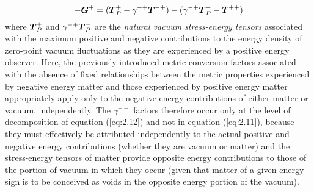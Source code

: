 \documentclass[notitlepage,12pt]{report}
\newcommand{\bm}[1]{\mbox{\boldmath $#1$}}
\begin{document}
\begin{equation}\label{eq:2.12}
-\bm{G}^+=(\bm{T}_P^{+}-\gamma^{-+}\bm{T}^{-+})-(\gamma^{-+}\bm{T}_P^{-}-\bm{T}^{++})
\end{equation}
where $\bm{T}_P^{+}$ and $\gamma^{-+}\bm{T}_P^{-}$ are the \textit{natural vacuum stress-energy tensors} associated with the maximum positive and negative contributions to the energy density of zero-point vacuum fluctuations as they are experienced by a positive energy observer. Here, the previously introduced metric conversion factors associated with the absence of fixed relationships between the metric properties experienced by negative energy matter and those experienced by positive energy matter appropriately apply only to the negative energy contributions of either matter or vacuum, independently. The $\gamma^{-+}$ factors therefore occur only at the level of decomposition of equation (\ref{eq:2.12}) and not in equation (\ref{eq:2.11}), because they must effectively be attributed independently to the actual positive and negative energy contributions (whether they are vacuum or matter) and the stress-energy tensors of matter provide opposite energy contributions to those of the portion of vacuum in which they occur (given that matter of a given energy sign is to be conceived as voids in the opposite energy portion of the vacuum).
\end{document}
